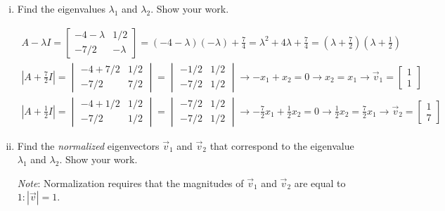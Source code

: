 \documentclass[10pt,letterpaper]{article}
\begin{document}
\begin{enumerate}[i)]
\item Find the eigenvalues $\lambda_{1}$ and $\lambda_{2}$. Show your work.

\color{violet}
\begin{gather*}
A - \lambda I = \begin{bmatrix}
-4 - \lambda & 1/2 \\
-7/2 & -\lambda
\end{bmatrix} = (-4 - \lambda)(-\lambda) + \frac{7}{4}= \lambda^{2} + 4\lambda + \frac{7}{4} = \left( \lambda + \frac{7}{2} \right)\left( \lambda + \frac{1}{2} \right) \\
\left| A + \frac{7}{2}I \right| =  \begin{vmatrix}
-4 + 7/2 & 1/2 \\
-7/2 & 7/2
\end{vmatrix} = \begin{vmatrix}
-1/2 & 1/2 \\
-7/2 & 1/2
\end{vmatrix} \longrightarrow -x_{1} + x_{2} = 0 \longrightarrow x_{2} = x_{1} \longrightarrow \vec{v}_{1} = \begin{bmatrix}
1 \\
1 
\end{bmatrix} \\
\left| A + \frac{1}{2}I \right| = \begin{vmatrix}
-4 + 1/2 & 1/2 \\
-7/2 & 1/2
\end{vmatrix} = \begin{vmatrix}
-7/2 & 1/2 \\
-7/2 & 1/2
\end{vmatrix} \longrightarrow -\frac{7}{2}x_{1} + \frac{1}{2}x_{2} = 0 \longrightarrow \frac{1}{2}x_{2} = \frac{7}{2}x_{1} \longrightarrow \vec{v}_{2} = \begin{bmatrix}
1 \\
7
\end{bmatrix}
\end{gather*}
\color{black}

\item Find the \textit{normalized} eigenvectors $\vec{v}_{1}$ and $\vec{v}_{2}$ that correspond to the eigenvalue $\lambda_{1}$ and $\lambda_{2}$. Show your work.

\noindent \textit{Note}: Normalization requires that the magnitudes of $\vec{v}_{1}$ and $\vec{v}_{2}$ are equal to $1: |\vec{v}| = 1$. 


\end{enumerate}
\end{document}
